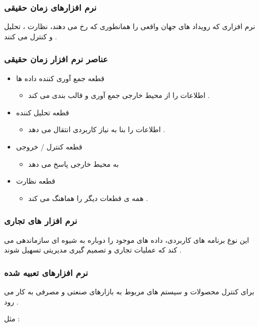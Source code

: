\documentclass[12pt]{book}
\begin{document}
\subsubsection{نرم افزارهای زمان حقیقی}

نرم افزاری که رویداد های جهان واقعی را همانطوری که رخ می دهند، نظارت ، تحلیل و کنترل می کنند .

\subsubsection{عناصر نرم افزار زمان حقیقی}

\begin{itemize}
	\item قطعه جمع آوری کننده داده ها
	\begin{itemize}
		\item اطلاعات را از محیط خارجی جمع آوری و قالب بندی می کند .
	\end{itemize}
	\item قطعه تحلیل کننده
	\begin{itemize}
		\item اطلاعات را بنا به نیاز کاربردی انتقال می دهد .
	\end{itemize}
	\item قطعه کنترل / خروجی
	\begin{itemize}
		\item به محیط خارجی پاسخ می دهد
	\end{itemize}
	\item قطعه نظارت
	\begin{itemize}
		\item همه ی قطعات دیگر را هماهنگ می کند .
	\end{itemize}
\end{itemize}



\subsubsection{نرم افزار های تجاری}
این نوع برنامه های کاربردی، داده های موجود را دوباره به شیوه ای سازماندهی می کند که عملیات تجاری و تصمیم گیری مدیریتی تسهیل شوند .


\subsubsection{نرم افزارهای تعبیه شده}
برای کنترل محصولات و سیستم های مربوط به بازارهای صنعتی و مصرفی به کار می رود .

مثل : 
\end{document}
